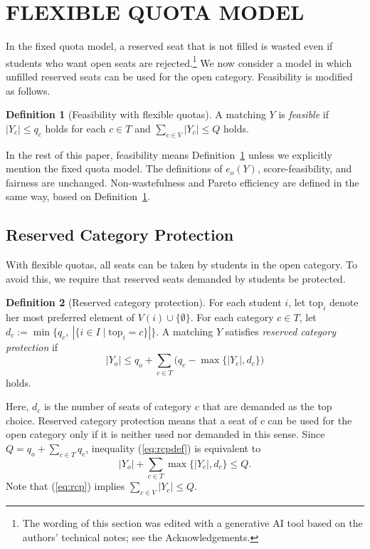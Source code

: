 \documentclass[a4paper,twoside]{article}
\theoremstyle{definition}
\newtheorem{definition}{Definition}
\newcommand{\topc}{\mathrm{top}}
\newcommand{\aiedit}{\footnote{The wording of this section was edited with a generative AI tool \cite{Anthropic26a} based on the authors' technical notes; see the Acknowledgements.}}
\begin{document}
\section{\uppercase{Flexible Quota Model}}
\label{sec:flexible}

In the fixed quota model, a reserved seat that is not filled is wasted even if students
who want open seats are rejected.\aiedit{}
We now consider a model in which unfilled reserved seats can be used for the open
category.
Feasibility is modified as follows.

\begin{definition}[Feasibility with flexible quotas]
\label{def:flexfeasibility}
A matching $Y$ is \emph{feasible} if $|Y_c|\le q_c$ holds for each $c\in T$ and
$\sum_{c\in V}|Y_c|\le Q$ holds.
\end{definition}

In the rest of this paper, feasibility means Definition~\ref{def:flexfeasibility} unless
we explicitly mention the fixed quota model.
The definitions of $e_o(Y)$, score-feasibility, and fairness are unchanged.
Non-wastefulness and Pareto efficiency are defined in the same way, based on
Definition~\ref{def:flexfeasibility}.

\subsection{Reserved Category Protection}

With flexible quotas, all seats can be taken by students in the open category.
To avoid this, we require that reserved seats demanded by students be protected.

\begin{definition}[Reserved category protection]
\label{def:rcp}
For each student $i$, let $\topc_i$ denote her most preferred element of
$V(i)\cup\{\emptyset\}$.
For each category $c\in T$, let
$d_c:=\min\{q_c,\ |\{i\in I\mid\topc_i=c\}|\}$.
A matching $Y$ satisfies \emph{reserved category protection} if
\begin{equation}
\label{eq:rcpdef}
|Y_o|\le q_o+\sum_{c\in T}\bigl(q_c-\max\{|Y_c|,d_c\}\bigr)
\end{equation}
holds.
\end{definition}

Here, $d_c$ is the number of seats of category $c$ that are demanded as the top choice.
Reserved category protection means that a seat of $c$ can be used for the open category
only if it is neither used nor demanded in this sense.
Since $Q=q_o+\sum_{c\in T}q_c$, inequality (\ref{eq:rcpdef}) is equivalent to
\begin{equation}
\label{eq:rcp}
|Y_o|+\sum_{c\in T}\max\{|Y_c|,d_c\}\le Q.
\end{equation}
Note that (\ref{eq:rcp}) implies $\sum_{c\in V}|Y_c|\le Q$.
\end{document}

